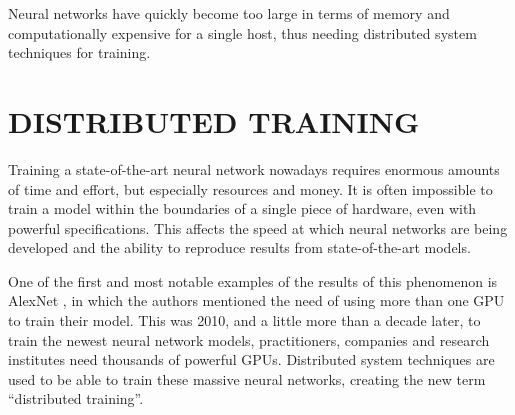 Neural networks have quickly become too large in terms of memory and computationally expensive for a single host, thus needing distributed system techniques for training.

\section{DISTRIBUTED TRAINING}
Training a state-of-the-art neural network nowadays requires enormous amounts of time and effort, but especially resources and money.
It is often impossible to train a model within the boundaries of a single piece of hardware, even with powerful specifications.
This affects the speed at which neural networks are being developed and the ability to reproduce results from state-of-the-art models.

One of the first and most notable examples of the results of this phenomenon is AlexNet \cite{alexnet2012}, in which the authors mentioned the need of using more than one GPU to train their model.
This was 2010, and a little more than a decade later, to train the newest neural network models, practitioners, companies and research institutes need thousands of powerful GPUs.
Distributed system techniques are used to be able to train these massive neural networks, creating the new term ``distributed training''.

